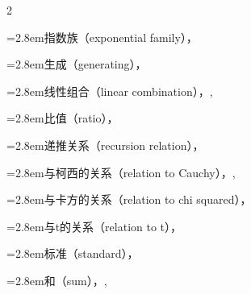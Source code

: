 \begin{multicols}{2}
\par\noindent\hangindent=2.8em\hspace*{1.8em}\label{idx:360}指数族（exponential family），\hyperref[ex:3.4.4]{\pageref*{ex:3.4.4}}\par
\par\noindent\hangindent=2.8em\hspace*{1.8em}\label{idx:361}生成（generating），\hyperref[eq:5.6.5]{\pageref*{eq:5.6.5}}\par
\par\noindent\hangindent=2.8em\hspace*{1.8em}\label{idx:362}线性组合（linear combination），\hyperref[cor:4.6.10]{\pageref*{cor:4.6.10}}, \hyperref[lem:5.3.3]{\pageref*{lem:5.3.3}}\par
\par\noindent\hangindent=2.8em\hspace*{1.8em}\label{idx:363}比值（ratio），\hyperref[ex:4.3.6]{\pageref*{ex:4.3.6}}\par
\par\noindent\hangindent=2.8em\hspace*{1.8em}\label{idx:364}递推关系（recursion relation），\hyperref[idxocc:364:90]{\pageref*{idxocc:364:90}}\par
\par\noindent\hangindent=2.8em\hspace*{1.8em}\label{idx:365}与柯西的关系（relation to Cauchy），\hyperref[ex:4.3.6]{\pageref*{ex:4.3.6}}, \hyperref[exercise:4.28]{\pageref*{exercise:4.28}}\par
\par\noindent\hangindent=2.8em\hspace*{1.8em}\label{idx:366}与卡方的关系（relation to chi squared），\hyperref[ex:2.1.9]{\pageref*{ex:2.1.9}}\par
\par\noindent\hangindent=2.8em\hspace*{1.8em}\label{idx:367}与t的关系（relation to t），\hyperref[exercise:5.18]{\pageref*{exercise:5.18}}\par
\par\noindent\hangindent=2.8em\hspace*{1.8em}\label{idx:368}标准（standard），\hyperref[idxocc:368:115]{\pageref*{idxocc:368:115}}\par
\par\noindent\hangindent=2.8em\hspace*{1.8em}\label{idx:369}和（sum），\hyperref[ex:4.2.13]{\pageref*{ex:4.2.13}}, \hyperref[ex:4.3.4]{\pageref*{ex:4.3.4}}\par

\end{multicols}
